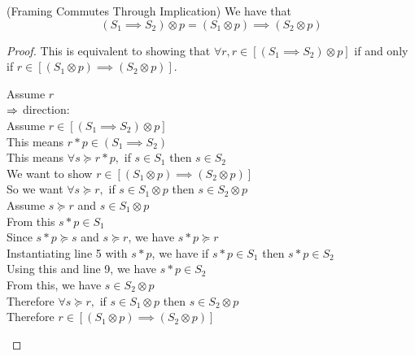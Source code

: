 \begin{lemma}{(Framing Commutes Through Implication)}
We have that
\begin{displaymath}
  (S_1 \implies S_2) \otimes p = (S_1 \otimes p) \implies (S_2 \otimes p) 
\end{displaymath}
\end{lemma}

\begin{proof}
This is equivalent to showing that $\forall r, r \in [(S_1 \implies S_2) \otimes p]$ if and
only if $r \in [(S_1 \otimes p) \implies (S_2 \otimes p)]$. 

\begin{tabbedproof}
\oo Assume $r$ \\
\ooo $\Rightarrow$ direction:\\
\oooo Assume $r \in [(S_1 \implies S_2) \otimes p]$ \\
\ooooo This means $r * p \in (S_1 \implies S_2)$ \\
\ooooo This means $\forall s \succeq r * p,$ if $s \in S_1$ then $s \in S_2$ \\
\ooooo We want to show $r \in [(S_1 \otimes p) \implies (S_2 \otimes p)]$ \\
\ooooo So we want $\forall s \succeq r,$ if  $s \in S_1 \otimes p$ then $s \in S_2 \otimes p$ \\
\ooooo Assume $s \succeq r$ and $s \in S_1 \otimes p$ \\
\oooooo From this $s * p \in S_1$ \\ 
\oooooo Since $s * p \succeq s$ and $s \succeq r$, we have $s * p \succeq r$ \\
\oooooo Instantiating line 5 with $s * p$, we have if $s * p \in S_1$ then $s * p \in S_2$ \\
\oooooo Using this and line 9, we have $s * p \in S_2$ \\
\oooooo From this, we have $s \in S_2 \otimes p$ \\
\ooooo Therefore $\forall s \succeq r,$ if  $s \in S_1 \otimes p$ then $s \in S_2 \otimes p$ \\
\ooooo Therefore $r \in [(S_1 \otimes p) \implies (S_2 \otimes p)]$ \\


\end{tabbedproof}
\end{proof}
